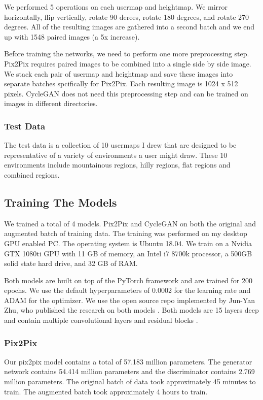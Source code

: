 \documentclass[twocolumn]{article}
\begin{document}
	We performed 5 operations on each usermap and heightmap. We mirror horizontally, flip vertically, rotate 90 derees, rotate 180 degrees, and rotate 270 degrees.	All of the resulting images are gathered into a second batch and we end up with 1548 paired images (a 5x increase).
	
	Before training the networks, we need to perform one more preprocessing step. Pix2Pix requires paired images to be combined into a single side by side image. We stack each pair of usermap and heightmap and save these images into separate batches spcifically for Pix2Pix. Each resulting image is 1024 x 512 pixels. CycleGAN does not need this preprocessing step and can be trained on images in different directories.
			
	\subsubsection{Test Data}
	
	The test data is a collection of 10 usermaps I drew that are designed to be representative of a variety of environments a user might draw. These 10 environments include mountainous regions, hilly regions, flat regions and combined regions.
	
	\subsection{Training The Models}
	
	We trained a total of 4 models. Pix2Pix and CycleGAN on both the original and augmented batch of training data. The training was performed on my desktop GPU enabled PC. The operating system is Ubuntu 18.04. We train on a Nvidia GTX 1080ti GPU with 11 GB of memory, an Intel i7 8700k processor, a 500GB solid state hard drive, and 32 GB of RAM.
	
	Both models are built on top of the PyTorch framework \cite{paszke2019pytorch} and are trained for 200 epochs. We use the default hyperparameters of 0.0002 for the learning rate and ADAM for the optimizer. We use the open source repo implemented by Jun-Yan Zhu, who published the research on both models \cite{junyanzhu2017github}. Both models are 15 layers deep and contain multiple convolutional layers and residual blocks \cite{isola2016imagetoimage} \cite{zhu2017unpaired}.
	
	\subsubsection{Pix2Pix}
		Our pix2pix model contains a total of 57.183 million parameters. The generator network contains 54.414 million parameters and the discriminator contains 2.769 million parameters. The original batch of data took approximately 45 minutes to train. The augmented batch took approximately 4 hours to train.
	
\end{document}
